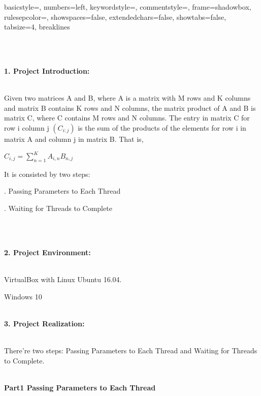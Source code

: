 \documentclass[12pt,a4paper]{article}
\begin{document}
\noindent

\lstset
{
	basicstyle=\ttfamily,
	numbers=left,
	keywordstyle=\color[RGB]{0,0,255},
	commentstyle=\color[RGB]{0,128,0},
	frame=shadowbox,
	rulesepcolor=\color{red!20!green!20!blue!20},
	showspaces=false,
	extendedchars=false,
	showtabs=false,
	tabsize=4, breaklines
}

\noindent{}
~\\
~\\
\begin{large}
\textbf{1. Project Introduction:}
\end{large}
~\\
Given two matrices A and B, where A is a matrix with M rows and K columns and matrix B contains K rows and N columns, the matrix product of A and B is matrix C, where C contains M rows and N columns. The entry in matrix C for row i column j $(C_{i:j})$ is the sum of the products of the elements for row i in matrix A and column j in matrix B. That is,

$C_{i,j}=\sum\limits_{n=1}^{K}A_{i,n}B_{n,j}$

It is consisted by two steps: 

. Passing Parameters to Each Thread

. Waiting for Threads to Complete

~\\
~\\
\begin{large}
\textbf{2. Project Environment:}
\end{large}
~\\

VirtualBox with Linux Ubuntu 16.04.

Windows 10 
~\\
~\\
\begin{large}
\textbf{3. Project Realization:}
\end{large}
~\\

There're two steps: Passing Parameters to Each Thread and Waiting for Threads to Complete.

~\\
 \textbf{Part1 Passing Parameters to Each Thread }
\end{document}
